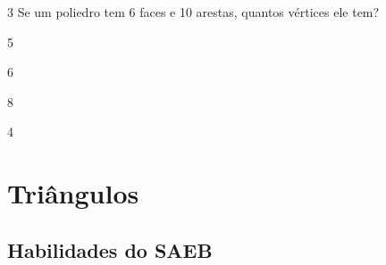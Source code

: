 \num{3} Se um poliedro tem 6 faces e 10 arestas, quantos vértices ele tem?

\begin{escolha}[itemsep=0pt]
\item 5
\item 6
\item 8
\item 4
\end{escolha}




\chapter{Triângulos}

\section*{Habilidades do SAEB }


